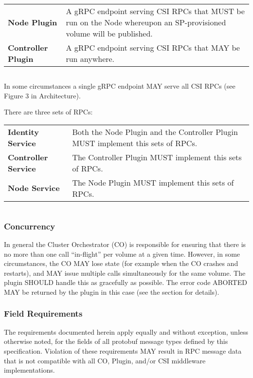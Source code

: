 \documentclass[12pt]{article}
\begin{document}
\begin{tabular}{lp{24em}}
    \bfseries Node Plugin & A gRPC endpoint serving CSI RPCs that MUST be run
    on the Node whereupon an SP-provisioned volume will be published. \\
    \bfseries Controller Plugin & A gRPC endpoint serving CSI RPCs that
    MAY be run anywhere. \\
\end{tabular}

\inputminted[breaklines,frame=lines,linenos,fontsize=\footnotesize]{proto}{src/opts.proto}

In some circumstances a single gRPC endpoint MAY serve all CSI RPCs (see
Figure 3 in Architecture).

There are three sets of RPCs: \\

\begin{tabular}{lp{24em}}
    \bfseries Identity Service & Both the Node Plugin and the Controller Plugin
    MUST implement this sets of RPCs. \\
    \bfseries Controller Service & The Controller Plugin MUST implement this sets of RPCs. \\
    \bfseries Node Service & The Node Plugin MUST implement this sets of RPCs. \\
\end{tabular}

\inputminted[breaklines,frame=lines,linenos,fontsize=\footnotesize]{proto}{src/rpcs.proto}

\subsubsection{Concurrency}

In general the Cluster Orchestrator (CO) is responsible for ensuring
that there is no more than one call “in-flight” per volume at a given
time. However, in some circumstances, the CO MAY lose state (for example
when the CO crashes and restarts), and MAY issue multiple calls
simultaneously for the same volume. The plugin SHOULD handle this as
gracefully as possible. The error code ABORTED MAY be returned by the
plugin in this case (see the  section for details).

\subsubsection{Field Requirements}

The requirements documented herein apply equally and without exception,
unless otherwise noted, for the fields of all protobuf message types
defined by this specification. Violation of these requirements MAY
result in RPC message data that is not compatible with all CO, Plugin,
and/or CSI middleware implementations.
\end{document}
